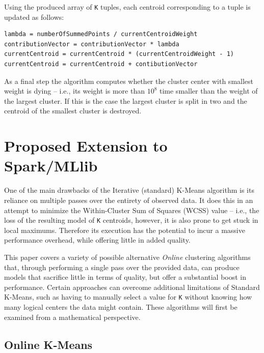 \documentclass{l4proj}
\begin{document}
Using the produced array of \texttt{K} tuples, each centroid corresponding to a tuple is updated as follows:

\begin{center}
\begin{BVerbatim}
lambda = numberOfSummedPoints / currentCentroidWeight
contributionVector = contributionVector * lambda
currentCentroid = currentCentroid * (currentCentroidWeight - 1)
currentCentroid = currentCentroid + contibutionVector
\end{BVerbatim}
\end{center}

As a final step the algorithm computes whether the cluster center with smallest weight is dying -- i.e., its weight is more than $10^8$ time smaller than the weight of the largest cluster. If this is the case the largest cluster is split in two and the centroid of the smallest cluster is destroyed.


\chapter{Proposed Extension to Spark/MLlib}
\label{propose}

One of the main drawbacks of the Iterative (standard) K-Means algorithm is its reliance on  multiple passes over the entirety of observed data. It does this in an attempt to minimize the Within-Cluster Sum of Squares (WCSS) value -- i.e., the loss of the resulting model of \texttt{K} centroids, however, it is also prone to get stuck in local maximums. Therefore its execution has the potential to incur a massive performance overhead, while offering little in added quality.

This paper covers a variety of possible alternative \textit{Online} clustering algorithms that, through performing a single pass over the provided data, can produce models that sacrifice little in terms of quality, but offer a substantial boost in performance. Certain approaches can overcome additional limitations of Standard K-Means, such as having to manually select a value for \texttt{K} without knowing how many logical centers the data might contain. These algorithms will first be examined from a mathematical perspective.

\section{Online K-Means}
\end{document}

